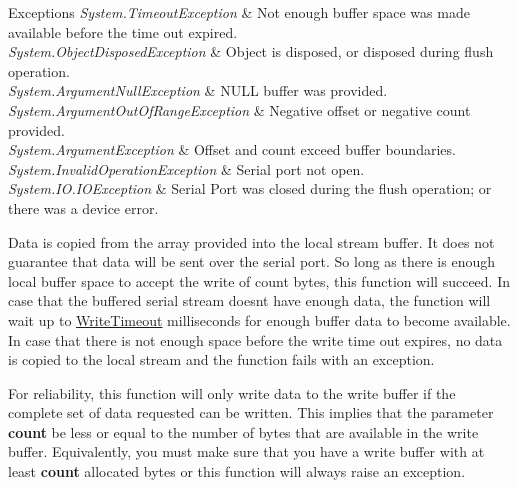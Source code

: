 \begin{DoxyExceptions}{Exceptions}
{\em System.\+Timeout\+Exception} & Not enough buffer space was made available before the time out expired.\\
\hline
{\em System.\+Object\+Disposed\+Exception} & Object is disposed, or disposed during flush operation.\\
\hline
{\em System.\+Argument\+Null\+Exception} & N\+U\+LL buffer was provided.\\
\hline
{\em System.\+Argument\+Out\+Of\+Range\+Exception} & Negative offset or negative count provided.\\
\hline
{\em System.\+Argument\+Exception} & Offset and count exceed buffer boundaries.\\
\hline
{\em System.\+Invalid\+Operation\+Exception} & Serial port not open.\\
\hline
{\em System.\+I\+O.\+I\+O\+Exception} & Serial Port was closed during the flush operation; or there was a device error.\\
\hline
\end{DoxyExceptions}


Data is copied from the array provided into the local stream buffer. It does not guarantee that data will be sent over the serial port. So long as there is enough local buffer space to accept the write of count bytes, this function will succeed. In case that the buffered serial stream doesn\textquotesingle{}t have enough data, the function will wait up to \mbox{\hyperlink{class_r_j_c_p_1_1_i_o_1_1_ports_1_1_serial_port_stream_ac81624fba3a2bfe67ddd418786803b43}{Write\+Timeout}} milliseconds for enough buffer data to become available. In case that there is not enough space before the write time out expires, no data is copied to the local stream and the function fails with an exception. 

For reliability, this function will only write data to the write buffer if the complete set of data requested can be written. This implies that the parameter {\bfseries{count}} be less or equal to the number of bytes that are available in the write buffer. Equivalently, you must make sure that you have a write buffer with at least {\bfseries{count}} allocated bytes or this function will always raise an exception.\mbox{\label{class_r_j_c_p_1_1_i_o_1_1_ports_1_1_serial_port_stream_a21ac6501b27d48ca4e8e0405b29d9214}} 
